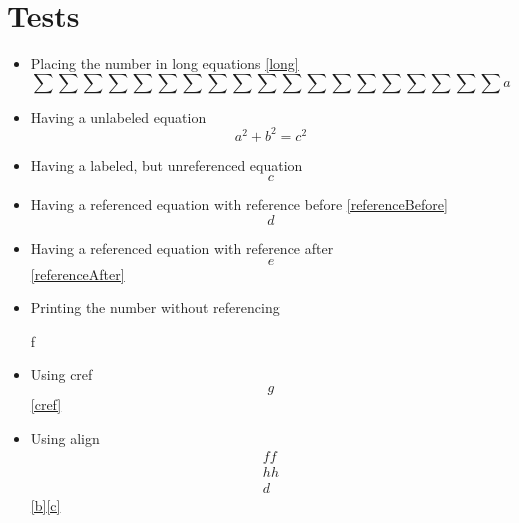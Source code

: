 \documentclass{article}
\begin{document}
	\section*{Tests}
	\begin{itemize}
		\item Placing the number in long equations \ref{long}
			\begin{equation}\label{long}
				\sum\sum\sum\sum\sum\sum\sum\sum\sum\sum\sum\sum\sum\sum\sum\sum\sum\sum\sum a
			\end{equation}
		\item Having a unlabeled equation
			\begin{equation}
				a^2 + b^2 = c^2
			\end{equation}
		\item Having a labeled, but unreferenced equation
			\begin{equation}\label{unreferenced}
				c
			\end{equation}
		\item Having a referenced equation with reference before \ref{referenceBefore}
			\begin{equation}\label{referenceBefore}
				d
			\end{equation}
		\item Having a referenced equation with reference after
			\begin{equation}\label{referenceAfter}
				e
			\end{equation}
			\ref{referenceAfter}
		\item Printing the number without referencing
			\begin{equation+}
				f
			\end{equation+}
		\item Using cref
			\begin{equation}\label{cref}
				g
			\end{equation}
			\cref{cref}
		\item Using align
		\begin{align}
ff\label{b}\\
hh\label{c}\\
d
\end{align}
\ref{b}\ref{c}%
	\end{itemize}


%
\end{document}
